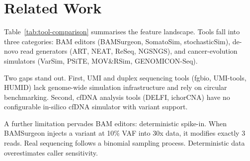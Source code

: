\section{Related Work}
\label{sec:related}

Table~\ref{tab:tool-comparison} summarises the feature landscape.
Tools fall into three categories: BAM editors (BAMSurgeon, SomatoSim\autocite{kuhnemund2017somatomsim}, stochasticSim\autocite{osullivan2023stochasticsim}), de-novo read generators (ART, NEAT, ReSeq, NGSNGS\autocite{ngsngs2023}), and cancer-evolution simulators (VarSim\autocite{mu2015varsim}, PSiTE\autocite{psyte2020psite}, MOV\&RSim\autocite{movsim2025}, GENOMICON-Seq\autocite{genomiconseq2025}).

Two gaps stand out.
First, UMI and duplex sequencing tools (fgbio\autocite{fgbio}, UMI-tools\autocite{smith2017umitools}, HUMID) lack genome-wide simulation infrastructure and rely on circular benchmarking.
Second, cfDNA analysis tools (DELFI\autocite{cristiano2019delfi}, ichorCNA\autocite{adalsteinsson2017ichorcna}) have no configurable in-silico cfDNA simulator with variant support.

A further limitation pervades BAM editors: deterministic spike-in.
When BAMSurgeon injects a variant at 10\% VAF into 30x data, it modifies exactly 3 reads.
Real sequencing follows a binomial sampling process.
Deterministic data overestimates caller sensitivity\autocite{osullivan2023stochasticsim}.

